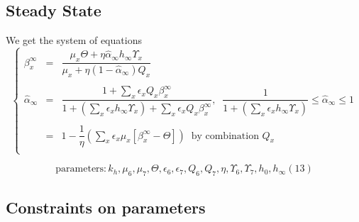 \documentclass[aps,onecolumn,10pt]{revtex4}
\newcommand{\mychem}[1]{\mathtt{#1}}
\newcommand{\spLi}[1]{{~^{\mychem{#1}}\mychem{Li}}}
\newcommand{\deltaLi}{ {\delta\!\!\!\spLi{7}} }
\newcommand{\LiAll}{\Lambda}
\newcommand{\LiAllOut}{{\LiAll}_{\mathrm{out}}}
\begin{document}
\subsection{Steady State}
We get the system of equations
\begin{equation}
\label{eq:steady}
\left\lbrace
\begin{array}{rcl}
	\beta_x^\infty & = & \dfrac{\mu_x\Theta + \eta \hat\alpha_\infty h_\infty \Upsilon_x}{\mu_x + \eta (1-\hat\alpha_\infty) Q_x}\\\
	\\
	\hat\alpha_\infty & = & \dfrac{1+\sum_x\epsilon_x Q_x\beta_x^\infty
	}{1 + \left(\sum_x \epsilon_x h_\infty \Upsilon_x \right) + \sum_x\epsilon_x Q_x\beta_x^\infty
	}, \;\; \dfrac{1}{1+\left(\sum_x \epsilon_x h_\infty \Upsilon_x \right)}\leq\hat\alpha_\infty \leq 1\\\
	\\
	& = & 1 - \dfrac{1}{\eta}\left( \sum_x \epsilon_x \mu_x \left[\beta_x^\infty - \Theta\right]\right) \;\; \text{by combination } Q_x\\
\end{array}
\right.
\end{equation}

\begin{equation}
\text{parameters} : k_h, \mu_6, \mu_7, \Theta, \epsilon_6, \epsilon_7, Q_6, Q_7, \eta, \Upsilon_6, \Upsilon_7, h_0, h_\infty (13)
\end{equation}


\subsection{Constraints on parameters}
\end{document}
